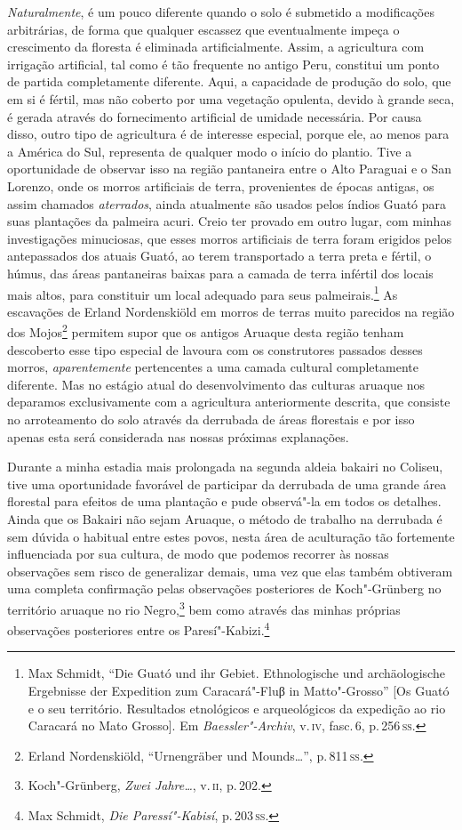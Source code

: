 \textit{Naturalmente}, é um pouco diferente quando o solo é submetido a
modificações arbitrárias, de forma que qualquer escassez que
eventualmente impeça o crescimento da floresta é eliminada
artificialmente. Assim, a agricultura com irrigação artificial, tal como
é tão frequente no antigo Peru, constitui um ponto de partida
completamente diferente. Aqui, a capacidade de produção do solo, que em
si é fértil, mas não coberto por uma vegetação opulenta, devido à grande
seca, é gerada através do fornecimento artificial de umidade necessária.
Por causa disso, outro tipo de agricultura é de interesse especial,
porque ele, ao menos para a América do Sul, representa de qualquer modo
o início do plantio. Tive a oportunidade de observar isso na região
pantaneira entre o Alto Paraguai e o San Lorenzo, onde os morros
artificiais de terra, provenientes de épocas antigas, os assim chamados
\textit{aterrados}, ainda atualmente são usados pelos índios Guató para suas
plantações da palmeira acuri. Creio ter provado em outro lugar, com
minhas investigações minuciosas, que esses morros artificiais de terra
foram erigidos pelos antepassados dos atuais Guató, ao terem
transportado a terra preta e fértil, o húmus, das áreas pantaneiras
baixas para a camada de terra infértil dos locais mais altos, para
constituir um local adequado para seus palmeirais.\footnote{Max Schmidt,
  ``Die Guató und ihr Gebiet. Ethnologische und archäologische
  Ergebnisse der Expedition zum Caracará"-Fluβ in Matto"-Grosso'' {[}Os
  Guató e o seu território. Resultados etnológicos e arqueológicos da
  expedição ao rio Caracará no Mato Grosso{]}. Em
  \textit{Baessler"-Archiv}, v.\,\textsc{iv}, fasc.\,6, p.\,256\,\textsc{ss}.} As escavações
de Erland Nordenskiöld em morros de terras muito parecidos na região dos
Mojos\footnote{Erland Nordenskiöld, ``Urnengräber und Mounds\ldots'', p.\,811\,\textsc{ss}.} permitem supor que os
antigos Aruaque desta região tenham descoberto esse tipo especial de lavoura
com os construtores passados desses morros, \textit{aparentemente} pertencentes
a uma camada cultural completamente diferente. Mas no estágio atual do
desenvolvimento das culturas aruaque nos deparamos exclusivamente com a
agricultura anteriormente descrita, que consiste no arroteamento do solo
através da derrubada de áreas florestais e por isso apenas esta será
considerada nas nossas próximas explanações.

Durante a minha estadia mais prolongada na segunda aldeia bakairi no
Coliseu, tive uma oportunidade favorável de participar da derrubada de
uma grande área florestal para efeitos de uma plantação e pude
observá"-la em todos os detalhes. Ainda que os Bakairi não sejam Aruaque,
o método de trabalho na derrubada é sem dúvida o habitual entre estes povos, 
nesta área de aculturação tão fortemente influenciada por sua cultura, 
de modo que podemos recorrer às nossas observações sem
risco de generalizar demais, uma vez que elas também obtiveram uma
completa confirmação pelas observações posteriores de Koch"-Grünberg no
território aruaque no rio Negro,\footnote{Koch"-Grünberg, \textit{Zwei Jahre\ldots}, v.\,\textsc{ii}, p.\,202.} bem como através das
minhas próprias observações posteriores entre os Paresí"-Kabizi.\footnote{Max
  Schmidt, \textit{Die Paressí"-Kabisí}, p.\,203\,\textsc{ss}.}

